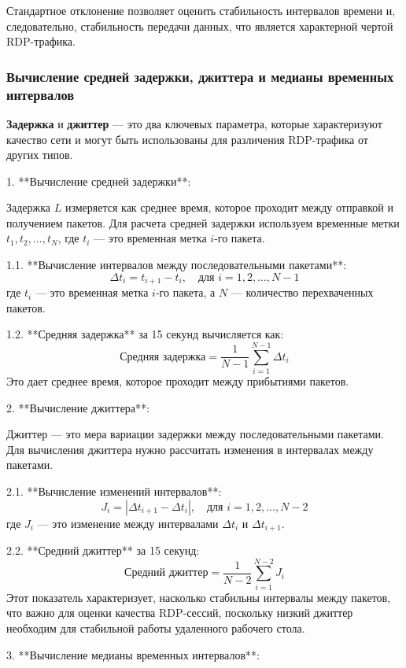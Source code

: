\documentclass[bachelor, och, coursework]{SCWorks}
\begin{document}
  Стандартное отклонение позволяет оценить стабильность интервалов времени и, следовательно, стабильность передачи данных, что является характерной чертой RDP-трафика.

\subsubsection{Вычисление средней задержки, джиттера и медианы временных интервалов}

\textbf{Задержка} и \textbf{джиттер} --- это два ключевых параметра, 
которые характеризуют качество сети и могут быть использованы для 
различения RDP-трафика от других типов.

1. **Вычисление средней задержки**:

   Задержка \( L \) измеряется как среднее время, которое проходит между отправкой и получением пакетов. Для расчета средней задержки используем временные метки \( t_1, t_2, \dots, t_N \), где \( t_i \) — это временная метка \( i \)-го пакета.

   1.1. **Вычисление интервалов между последовательными пакетами**:
   \[
   \Delta t_i = t_{i+1} - t_i, \quad \text{для } i = 1, 2, \dots, N-1
   \]
   где \( t_i \) — это временная метка \( i \)-го пакета, а \( N \) — количество перехваченных пакетов.

   1.2. **Средняя задержка** за 15 секунд вычисляется как:
   \[
   \text{Средняя задержка} = \frac{1}{N-1} \sum_{i=1}^{N-1} \Delta t_i
   \]
   Это дает среднее время, которое проходит между прибытиями пакетов.

2. **Вычисление джиттера**:

   Джиттер — это мера вариации задержки между последовательными пакетами. Для вычисления джиттера нужно рассчитать изменения в интервалах между пакетами.

   2.1. **Вычисление изменений интервалов**:
   \[
   J_i = |\Delta t_{i+1} - \Delta t_i|, \quad \text{для } i = 1, 2, \dots, N-2
   \]
   где \( J_i \) — это изменение между интервалами \( \Delta t_i \) и \( \Delta t_{i+1} \).

   2.2. **Средний джиттер** за 15 секунд:
   \[
   \text{Средний джиттер} = \frac{1}{N-2} \sum_{i=1}^{N-2} J_i
   \]
   Этот показатель характеризует, насколько стабильны интервалы между пакетов, что важно для оценки качества RDP-сессий, поскольку низкий джиттер необходим для стабильной работы удаленного рабочего стола.

3. **Вычисление медианы временных интервалов**:
\end{document}
